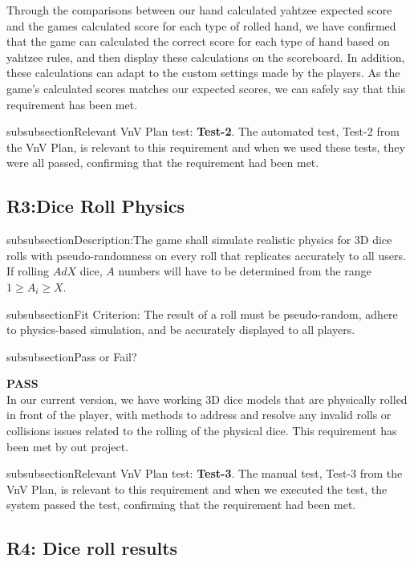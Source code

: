 \documentclass[12pt, titlepage]{article}
\begin{document}
 \noindent  Through the comparisons between our hand calculated yahtzee  expected score and the games calculated score for each type of rolled hand, we have confirmed that the game can calculated the correct score for each type of hand based on yahtzee rules, and then display these calculations on the scoreboard. In addition, these calculations can adapt to the custom settings made by the players. As the game's calculated scores matches our expected scores, we can safely say that this requirement has been met. 
 
 \*subsubsection{Relevant VnV Plan test: }  \textbf{ Test-2}. The automated test, Test-2 from the VnV Plan, is relevant to this requirement and when we used these tests, they were all passed, confirming that the requirement had been met.

\subsection{ R3:Dice Roll Physics} 
  
\*subsubsection{Description:}The game shall simulate realistic physics for 3D dice rolls with pseudo-randomness on every roll that replicates accurately to all users. If rolling $AdX$ dice, $A$ numbers will have to be determined from the range $1 \geq A_{i} \geq X$.

\*subsubsection{Fit Criterion:} The result of a roll must be pseudo-random, adhere to physics-based simulation, and be accurately displayed to all players.

\*subsubsection{Pass or Fail?} 

 \noindent \textbf{PASS}\\
 
 \noindent In our current version, we have working 3D dice models that are physically rolled in front of the player, with methods to address and resolve any invalid rolls or collisions issues related to the rolling of the physical dice.  This requirement has been met by out project.

 \*subsubsection{Relevant VnV Plan test: }  \textbf{ Test-3}. The manual test, Test-3 from the VnV Plan, is relevant to this requirement and when we executed the test, the system passed the test, confirming that the requirement had been met.
 
\subsection{R4: Dice roll results} 
\end{document}
